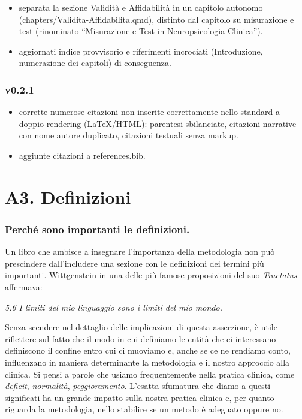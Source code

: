 \documentclass[
  italian,
  letterpaper,
  paper=6in:9in,
  pagesize=pdftex,
  headinclude=on,
  footinclude=on,
  11pt]{scrbook}
\providecommand{\tightlist}{%
  \setlength{\itemsep}{0pt}\setlength{\parskip}{0pt}}
\begin{document}
\begin{itemize}
\tightlist
\item
  separata la sezione Validità e Affidabilità in un capitolo autonomo
  (chapters/Validita-Affidabilita.qmd), distinto dal capitolo su
  misurazione e test (rinominato ``Misurazione e Test in Neuropsicologia
  Clinica'').
\item
  aggiornati indice provvisorio e riferimenti incrociati (Introduzione,
  numerazione dei capitoli) di conseguenza.
\end{itemize}

\subsection*{v0.2.1}\label{v0.2.1}

\begin{itemize}
\tightlist
\item
  corrette numerose citazioni non inserite correttamente nello standard
  a doppio rendering (LaTeX/HTML): parentesi sbilanciate, citazioni
  narrative con nome autore duplicato, citazioni testuali senza markup.
\item
  aggiunte citazioni a references.bib.
\end{itemize}

\chapter*{A3. Definizioni}\label{definizioni}


\subsection*{Perché sono importanti le
definizioni.}\label{perchuxe9-sono-importanti-le-definizioni.}

Un libro che ambisce a insegnare l'importanza della metodologia non può
prescindere dall'includere una sezione con le definizioni dei termini
più importanti. Wittgenstein in una delle più famose proposizioni del
suo \emph{Tractatus} affermava:

\emph{5.6 I limiti del mio linguaggio sono i limiti del mio mondo.}

Senza scendere nel dettaglio delle implicazioni di questa asserzione, è
utile riflettere sul fatto che il modo in cui definiamo le entità che ci
interessano definiscono il confine entro cui ci muoviamo e, anche se ce
ne rendiamo conto, influenzano in maniera determinante la metodologia e
il nostro approccio alla clinica. Si pensi a parole che usiamo
frequentemente nella pratica clinica, come \emph{deficit},
\emph{normalità}, \emph{peggioramento}. L'esatta sfumatura che diamo a
questi significati ha un grande impatto sulla nostra pratica clinica e,
per quanto riguarda la metodologia, nello stabilire se un metodo è
adeguato oppure no.
\end{document}
